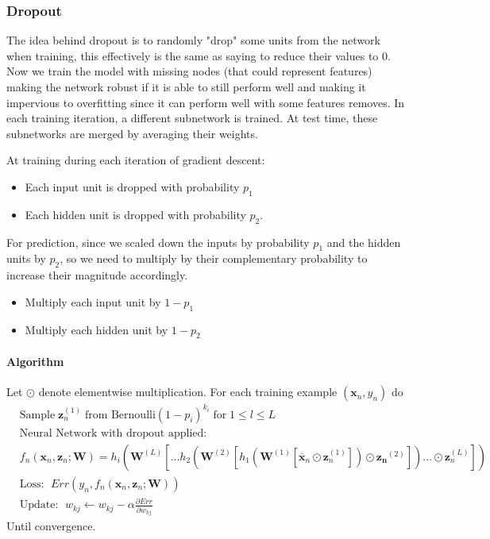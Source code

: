 \documentclass[12pt]{article}
\begin{document}
        \subsubsection{Dropout} \label{sec:Dropout}
            The idea behind dropout is to randomly "drop" some units from the network when training, this effectively is
            the same as saying to reduce their values to 0. Now we train the model with missing nodes (that could
            represent features) making the network robust if it is able to still perform well and making it impervious
            to overfitting since it can perform well with some features removes. In each training iteration, a different
            subnetwork is trained. At test time, these subnetworks are merged by averaging their weights.

            At training during each iteration of gradient descent:
            \begin{itemize}
                \item Each input unit is dropped with probability $p_1$
                \item Each hidden unit is dropped with probability $p_2$.
            \end{itemize}

            For prediction, since we scaled down the inputs by probability $p_1$ and the hidden units by $p_2$, so we need to
            multiply by their complementary probability to increase their magnitude accordingly.
            \begin{itemize}
                \item Multiply each input unit by $1 - p_1$
                \item Multiply each hidden unit by $1 - p_2$
            \end{itemize}

            \paragraph{Algorithm}
            Let $\odot$ denote elementwise multiplication.
            For each training example $(\boldsymbol{x}_n, y_n)$ do
            \begin{align*}
                & \text{Sample} \; \boldsymbol{z}_n^{(1)} \; \text{from Bernoulli} (1 - p_i)^{k_i} \; \text{for} \; 1 \leq l \leq L \\
                & \text{Neural Network with dropout applied: } \\ 
                & f_n(\boldsymbol{x}_n, \boldsymbol{z}_n; \boldsymbol{W}) = h_i(\boldsymbol{W}^{(L)} [...h_2(\boldsymbol{W}^{(2)}[h_1(\boldsymbol{W}^{(1)}[\overline{\boldsymbol{x}}_n \odot \boldsymbol{z}_n^{(1)}])\odot \boldsymbol{z_n}^{(2)}])... \odot \boldsymbol{z}_n^{(L)}]) \\
                & \text{Loss: } \; Err(y_n, f_n(\boldsymbol{x}_n, \boldsymbol{z}_n; \boldsymbol{W})) \\
                & \text{Update: } \; w_{kj} \leftarrow w_{kj} - \alpha \frac{\partial Err}{\partial w_{kj}}
            \end{align*}
            Until convergence.
\end{document}
